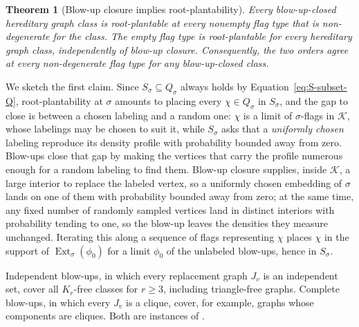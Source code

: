 \documentclass[acmsmall,screen=true,acmthm=false]{acmart}
\newtheorem{theorem}{Theorem}[section]
\newcommand{\Ext}{\operatorname{Ext}}
\begin{document}
\begin{theorem}[Blow-up closure implies root-plantability]
\label{thm:blowup-root-plantability-summary}
Every blow-up-closed hereditary graph class is root-plantable at every
nonempty flag type that is non-degenerate for the class.  The empty flag type is
root-plantable for every hereditary graph class, independently of blow-up
closure.  Consequently, the two orders agree at every non-degenerate flag type
for any blow-up-closed class.
\end{theorem}

We sketch the first claim.  Since \(S_\sigma\subseteq Q_\sigma\) always holds
by Equation~\eqref{eq:S-subset-Q}, root-plantability at \(\sigma\) amounts to
placing every \(\chi\in Q_\sigma\) in \(S_\sigma\), and the gap to close is
between a chosen labeling and a random one: \(\chi\) is a limit of
\(\sigma\)-flags in \(\mathcal K\), whose labelings may be chosen to suit it,
while \(S_\sigma\) asks that a \emph{uniformly chosen} labeling reproduce its
density profile with probability bounded away from zero.  Blow-ups close that gap by making the vertices that carry the profile numerous
enough for a random labeling to find them.  Blow-up closure supplies, inside
\(\mathcal K\), a large interior to replace the labeled vertex, so a uniformly
chosen embedding of \(\sigma\) lands on
one of them with probability bounded away from zero; at the same time, any
fixed number of randomly sampled vertices land in distinct interiors with
probability tending to one, so the blow-up leaves the densities they measure
unchanged.  Iterating this along
a sequence of flags representing \(\chi\) places \(\chi\) in the support of
\(\Ext_\sigma(\phi_0)\) for a limit \(\phi_0\) of the unlabeled blow-ups,
hence in \(S_\sigma\).

Independent blow-ups, in which every replacement graph \(J_v\) is an
independent set, cover all \(K_r\)-free classes
for \(r\geq3\), including triangle-free graphs.  Complete blow-ups, in which
every \(J_v\) is a clique, cover, for example, graphs whose components are
cliques.  Both are instances of
.
\end{document}
